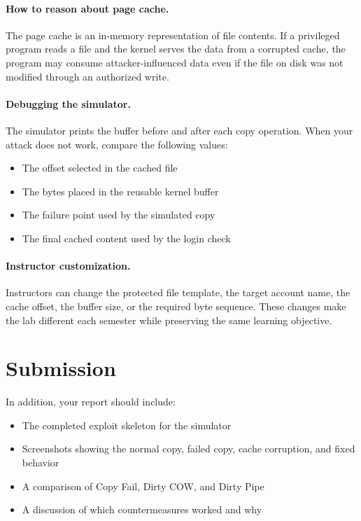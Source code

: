 \paragraph{How to reason about page cache.}
The page cache is an in-memory representation of file contents. If a privileged
program reads a file and the kernel serves the data from a corrupted cache, the
program may consume attacker-influenced data even if the file on disk was not
modified through an authorized write.

\paragraph{Debugging the simulator.}
The simulator prints the buffer before and after each copy operation. When your
attack does not work, compare the following values:

\begin{itemize}[noitemsep]
\item The offset selected in the cached file
\item The bytes placed in the reusable kernel buffer
\item The failure point used by the simulated copy
\item The final cached content used by the login check
\end{itemize}

\paragraph{Instructor customization.}
Instructors can change the protected file template, the target account name,
the cache offset, the buffer size, or the required byte sequence. These changes
make the lab different each semester while preserving the same learning
objective.


\section{Submission}



In addition, your report should include:

\begin{itemize}[noitemsep]
\item The completed exploit skeleton for the simulator
\item Screenshots showing the normal copy, failed copy, cache corruption, and
      fixed behavior
\item A comparison of Copy Fail, Dirty COW, and Dirty Pipe
\item A discussion of which countermeasures worked and why
\end{itemize}


